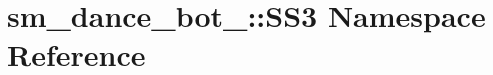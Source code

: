 \hypertarget{namespacesm__dance__bot__2_1_1SS3}{}\section{sm\+\_\+dance\+\_\+bot\+\_\+:\+:S\+S3 Namespace Reference}
\label{namespacesm__dance__bot__2_1_1SS3}
